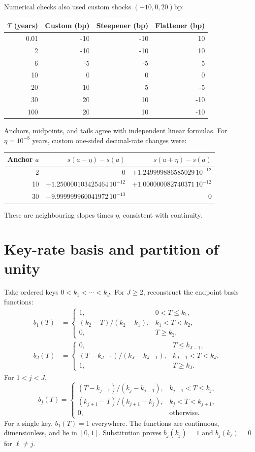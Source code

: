 \documentclass[12pt,a4paper]{article}
\newcommand{\bp}{\mathrm{bp}}
\begin{document}
Numerical checks also used custom shocks $(-10,0,20)\bp$:
\begin{center}\small
\begin{tabular}{@{}rrrr@{}}
\toprule
$T$ (years) & Custom (bp) & Steepener (bp) & Flattener (bp)\\
\midrule
0.01 & -10 & -10 & 10\\
2 & -10 & -10 & 10\\
6 & -5 & -5 & 5\\
10 & 0 & 0 & 0\\
20 & 10 & 5 & -5\\
30 & 20 & 10 & -10\\
100 & 20 & 10 & -10\\
\bottomrule
\end{tabular}
\end{center}
Anchors, midpoints, and tails agree with independent linear formulas.
For $\eta=10^{-8}$ years, custom one-sided decimal-rate changes were:
\begin{center}\small
\begin{tabular}{@{}rrr@{}}
\toprule
Anchor $a$ & $s(a-\eta)-s(a)$ & $s(a+\eta)-s(a)$\\
\midrule
2 & 0 & $+1.249999886585029\,10^{-12}$\\
10 & $-1.250000103425464\,10^{-12}$ & $+1.000000082740371\,10^{-12}$\\
30 & $-9.999999960041972\,10^{-13}$ & 0\\
\bottomrule
\end{tabular}
\end{center}
These are neighbouring slopes times $\eta$, consistent with continuity.

\section{Key-rate basis and partition of unity}
Take ordered keys $0<k_1<\cdots<k_J$. For $J\geq2$, reconstruct the
endpoint basis functions:
\begin{align}
 b_1(T)&=\begin{cases}
 1,&0<T\leq k_1,\\
 (k_2-T)/(k_2-k_1),&k_1<T<k_2,\\
 0,&T\geq k_2,
 \end{cases}\\
 b_J(T)&=\begin{cases}
 0,&T\leq k_{J-1},\\
 (T-k_{J-1})/(k_J-k_{J-1}),&k_{J-1}<T<k_J,\\
 1,&T\geq k_J.
 \end{cases}
\end{align}
For $1<j<J$,
\begin{equation}
 b_j(T)=\begin{cases}
 (T-k_{j-1})/(k_j-k_{j-1}),&k_{j-1}<T\leq k_j,\\
 (k_{j+1}-T)/(k_{j+1}-k_j),&k_j<T<k_{j+1},\\
 0,&\text{otherwise}.
 \end{cases}
\end{equation}
For a single key, $b_1(T)=1$ everywhere.
The functions are continuous, dimensionless, and lie in $[0,1]$.
Substitution proves $b_j(k_j)=1$ and $b_j(k_\ell)=0$ for $\ell\ne j$.
\end{document}
